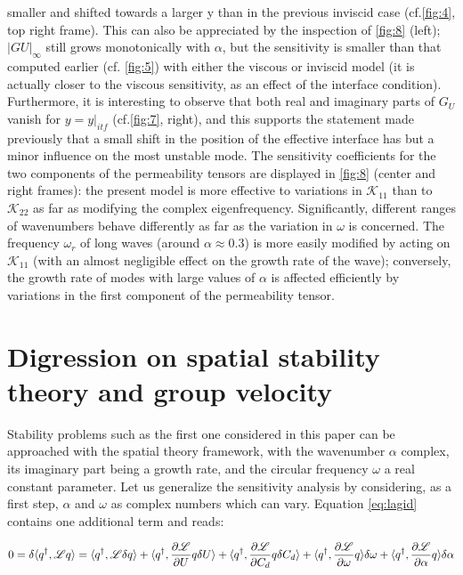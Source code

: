 smaller and shifted towards a larger y than in the previous inviscid case (cf.\ref{fig:4}, top right frame).
This can also be appreciated by the inspection of \ref{fig:8} (left); $|G U |_{\infty}$ still grows monotonically with
$\alpha$, but the sensitivity is smaller than that computed earlier (cf. \ref{fig:5}) with either the viscous or
inviscid model (it is actually closer to the viscous sensitivity, as an effect of the interface condition).
Furthermore, it is interesting to observe that both real and imaginary parts of $G_U$ vanish for $y = y|_{itf}$
(cf.\ref{fig:7}, right), and this supports the statement made previously that a small shift in the position
of the effective interface has but a minor influence on the most unstable mode.
The sensitivity coefficients for the two components of the permeability tensors are displayed in
\ref{fig:8} (center and right frames): the present model is more effective to variations in $\mathcal{K}_{11}$ than to $\mathcal{K}_{22}$
as far as modifying the complex eigenfrequency. Significantly, different ranges of wavenumbers
behave differently as far as the variation in $\omega$ is concerned. The frequency $\omega_r$ of long waves (around
$\alpha \approx 0.3$) is more easily modified by acting on $\mathcal{K}_{11}$ (with an almost negligible effect on the growth
rate of the wave); conversely, the growth rate of modes with large values of $\alpha$ is affected efficiently
by variations in the first component of the permeability tensor.


\section*{Digression on spatial stability theory and group velocity}
\label{appB}

Stability problems such as the first one considered in this paper can be approached with the
spatial theory framework, with the wavenumber $\alpha$ complex, its imaginary part being a growth rate,
and the circular frequency $\omega$ a real constant parameter. Let us generalize the sensitivity analysis by
considering, as a first step, $\alpha$ and $\omega$ as complex numbers which can vary. Equation \ref{eq:lagid} contains one
additional term and reads:

\begin{equation}
0 = \delta \langle q^{\dagger}, \mathscr{L} q \rangle = 
\langle q^{\dagger}, \mathscr{L} \delta q \rangle +
\langle q^{\dagger}, \dfrac{\partial \mathscr{L}}{\partial U}  q \delta U\rangle +
\langle q^{\dagger}, \dfrac{\partial \mathscr{L}}{\partial C_d}  q \delta C_d\rangle +
\langle q^{\dagger}, \dfrac{\partial \mathscr{L}}{\partial \omega}  q \rangle \delta \omega +
\langle q^{\dagger}, \dfrac{\partial \mathscr{L}}{\partial \alpha}  q \rangle \delta \alpha
\label{eq:lagid_spatial}
\end{equation}


